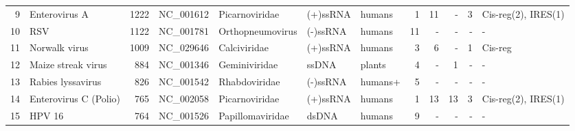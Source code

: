 \begin{center}
\begin{tabular}{r|l|r|l|l|l|l|r|r|r|r|l}
     9 & Enterovirus A      &        1222  & NC\_001612      & Picarnoviridae & (+)ssRNA & humans &     1 &      11 &        - & 3  & Cis-reg(2), IRES(1) \\
    10 & RSV                &        1122  & NC\_001781      &Orthopneumovirus& (-)ssRNA & humans &    11 &       - &        - & -  & - \\
    11 & Norwalk virus      &        1009  & NC\_029646      & Calciviridae   & (+)ssRNA & humans &     3 &       6 &        - & 1  & Cis-reg \\ 
    12 & Maize streak virus &         884  & NC\_001346      & Geminiviridae  & ssDNA    & plants &     4 &       - &        1 & -  & -  \\
    13 & Rabies lyssavirus  &         826  & NC\_001542      & Rhabdoviridae  & (-)ssRNA & humans+&     5 &       - &        - & -  & -  \\
    14 & Enterovirus C (Polio) &      765  & NC\_002058      & Picarnoviridae & (+)ssRNA & humans &     1 &      13 &       13 & 3  & Cis-reg(2), IRES(1) \\
    15 & HPV 16             &         764  & NC\_001526      &Papillomaviridae& dsDNA    & humans &     9 &       - &        - & -  & - \\
\end{tabular}
\end{center}
